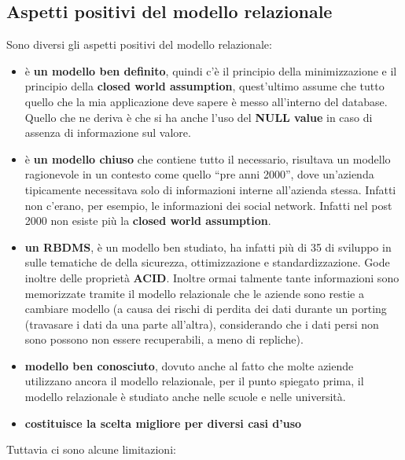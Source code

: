 \subsection{Aspetti positivi del modello relazionale}
Sono diversi gli aspetti positivi del modello relazionale:
\begin{itemize}
    \item è \textbf{un modello ben definito}, quindi c'è il principio della minimizzazione e il principio della \textbf{closed world assumption}, quest'ultimo assume che tutto quello che la mia applicazione deve sapere è messo all'interno del database. Quello che ne deriva è che si ha anche l’uso del \textbf{NULL value} in caso di assenza di informazione sul valore.
    \item è \textbf{ un modello chiuso} che contiene tutto il necessario, risultava un modello ragionevole in un contesto come quello “pre anni 2000”, dove un’azienda tipicamente necessitava solo di informazioni interne all’azienda stessa. Infatti non c’erano, per esempio, le informazioni dei social network. Infatti nel post 2000 non esiste più la \textbf{closed world assumption}.
    \item \textbf{un RBDMS}, è un modello ben studiato, ha infatti più di 35 di sviluppo in sulle tematiche de della sicurezza, ottimizzazione e standardizzazione. Gode inoltre delle proprietà \textbf{ACID}. 
    Inoltre ormai talmente tante informazioni sono memorizzate tramite il modello relazionale che le aziende sono restie a cambiare modello (a causa dei rischi di perdita dei dati durante un porting (travasare i dati da una parte all’altra), considerando che i dati persi non sono possono non essere recuperabili, a meno di repliche).
    \item \textbf{modello ben conosciuto}, dovuto anche al fatto che molte aziende utilizzano ancora il modello relazionale, per il punto spiegato prima, il modello relazionale è studiato anche nelle scuole e nelle università.
    \item \textbf{costituisce la scelta migliore per diversi casi d’uso}
\end{itemize}
Tuttavia ci sono alcune limitazioni:
